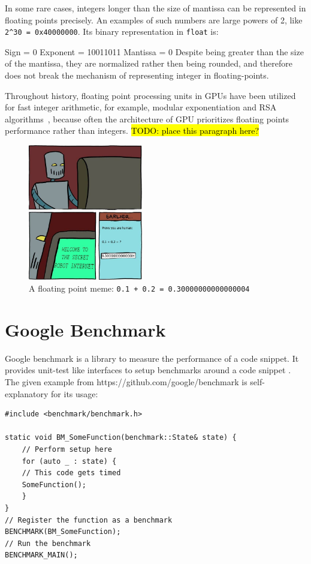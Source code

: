 \documentclass[logo,bsc,singlespacing,parskip]{infthesis}
\newcommand{\dtfloat}{\texttt{float}}
\newenvironment{VerbatimCompact}
  {\vspace*{-2.5mm}\VerbatimEnvironment
   \par\Verbatim}
  {\endVerbatim\vspace*{-2.4mm}}
\begin{document}
In some rare cases, integers longer than the size of mantissa can be represented
in floating points precisely. An examples of such numbers are large powers of 2,
like \texttt{2\^{}30 = 0x40000000}. Its binary representation in \dtfloat{}
is:
\begin{VerbatimCompact}
Sign     = 0
Exponent = 10011011
Mantissa = 0
\end{VerbatimCompact}
Despite being greater than the size of
the mantissa, they are normalized rather then being rounded, and therefore does
not break the mechanism of representing integer in floating-points.

Throughout history, floating point processing units in GPUs have been utilized
for fast integer arithmetic, for example, modular exponentiation
\cite{intfpu-modexp} and RSA algorithms~\cite{intfpu-rsa}, because often the
architecture of GPU prioritizes floating points performance rather than
integers. 
\hl{TODO: place this paragraph here?}


\begin{figure}
\begin{center}
    \includegraphics[width=50mm,scale=0.1]{image/0.3004.jpg}
    \caption{A floating point meme: \texttt{0.1 + 0.2 = 0.30000000000000004}}
    \label{meme}
\end{center}
\end{figure}

\section{Google Benchmark}
Google benchmark is a library to measure the performance of a code snippet. It
provides unit-test like interfaces to setup benchmarks around a code snippet
\cite{googlebench}. The given example from https://github.com/google/benchmark
is self-explanatory for its usage: 

\begin{verbatim}
#include <benchmark/benchmark.h>

static void BM_SomeFunction(benchmark::State& state) {
    // Perform setup here
    for (auto _ : state) {
    // This code gets timed
    SomeFunction();
    }
}
// Register the function as a benchmark
BENCHMARK(BM_SomeFunction);
// Run the benchmark
BENCHMARK_MAIN();
\end{verbatim}
\end{document}
